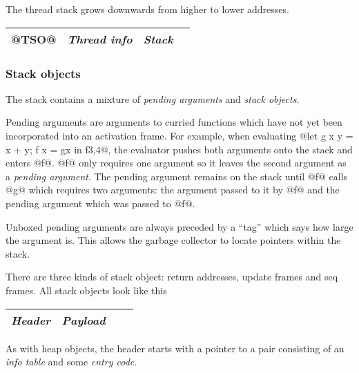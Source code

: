 \documentclass[11pt]{article}
\newcommand{\Subsubsection}[2]{\subsubsection{#1}\label{sec:#2}}
\begin{document}
\begin{description}
The thread stack grows downwards from higher to lower addresses.

\begin{center}
\begin{tabular}{|l|l|l|l|}\hline
@TSO@ & \emph{Thread info} & \emph{Stack} \\ \hline
\end{tabular}
\end{center}

\end{description}

\Subsubsection{Stack objects}{stack-objects-overview}

The stack contains a mixture of \emph{pending arguments} and 
\emph{stack objects}.

Pending arguments are arguments to curried functions which have not
yet been incorporated into an activation frame.  For example, when
evaluating @let { g x y = x + y; f x = g{x} } in f{3,4}@, the
evaluator pushes both arguments onto the stack and enters @f@.  @f@
only requires one argument so it leaves the second argument as a
\emph{pending argument}.  The pending argument remains on the stack
until @f@ calls @g@ which requires two arguments: the argument passed
to it by @f@ and the pending argument which was passed to @f@.

Unboxed pending arguments are always preceded by a ``tag'' which says
how large the argument is.  This allows the garbage collector to
locate pointers within the stack.

There are three kinds of stack object: return addresses, update frames
and seq frames.  All stack objects look like this

\begin{center}
\begin{tabular}{|l|l|l|l|}\hline
\emph{Header} & \emph{Payload} \\ \hline
\end{tabular}
\end{center}

As with heap objects, the header starts with a pointer to a pair
consisting of an \emph{info table} and some \emph{entry code}.
\end{document}
